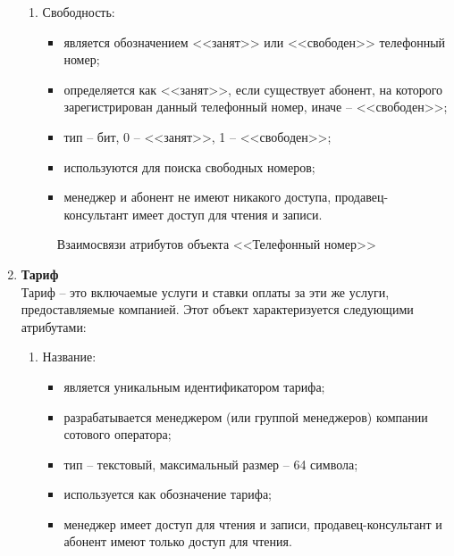 \begin{enumerate}
\begin{enumerate}
        \item Свободность:
        \begin{itemize}
            \item является обозначением <<занят>> или <<свободен>> телефонный номер;
            \item определяется как <<занят>>, если существует абонент, на которого зарегистрирован данный телефонный номер, иначе -- <<свободен>>;
            \item тип -- бит, 0 -- <<занят>>, 1 -- <<свободен>>;
            \item используются для поиска свободных номеров;
            \item менеджер и абонент не имеют никакого доступа, продавец-консультант имеет доступ для чтения и записи.
        \end{itemize}
    \end{enumerate}
    \begin{figure}[H]
        \label{fig:telephone-number-attributes}
        \caption{Взаимосвязи атрибутов объекта <<Телефонный номер>>}
    \end{figure}

    \item \textbf{Тариф} \\
    Тариф -- это включаемые услуги и ставки оплаты за эти же услуги, предоставляемые компанией. Этот объект характеризуется следующими атрибутами:
    \begin{enumerate}
        \item Название:
        \begin{itemize}
            \item является уникальным идентификатором тарифа;
            \item разрабатывается менеджером (или группой менеджеров) компании сотового оператора;
            \item тип -- текстовый, максимальный размер -- 64 символа;
            \item используется как обозначение тарифа;
            \item менеджер имеет доступ для чтения и записи, продавец-консультант и абонент имеют только доступ для чтения.
        \end{itemize}


\end{enumerate}
\end{enumerate}
